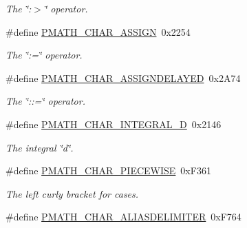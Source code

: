\begin{CompactItemize}
\begin{CompactList}\small\item\em The \char`\"{}:$>$\char`\"{} operator. \item\end{CompactList}\item 
\hypertarget{group__parser_gf80897e6fd9da9890087ad43967cf73b}{
\#define \hyperlink{group__parser_gf80897e6fd9da9890087ad43967cf73b}{PMATH\_\-CHAR\_\-ASSIGN}~0x2254}
\label{group__parser_gf80897e6fd9da9890087ad43967cf73b}

\begin{CompactList}\small\item\em The \char`\"{}:=\char`\"{} operator. \item\end{CompactList}\item 
\hypertarget{group__parser_g59eb4cde2e72bbfd90b6c2daf5521648}{
\#define \hyperlink{group__parser_g59eb4cde2e72bbfd90b6c2daf5521648}{PMATH\_\-CHAR\_\-ASSIGNDELAYED}~0x2A74}
\label{group__parser_g59eb4cde2e72bbfd90b6c2daf5521648}

\begin{CompactList}\small\item\em The \char`\"{}::=\char`\"{} operator. \item\end{CompactList}\item 
\hypertarget{group__parser_g819162acc8735cfe2a955796bb65583a}{
\#define \hyperlink{group__parser_g819162acc8735cfe2a955796bb65583a}{PMATH\_\-CHAR\_\-INTEGRAL\_\-D}~0x2146}
\label{group__parser_g819162acc8735cfe2a955796bb65583a}

\begin{CompactList}\small\item\em The integral \char`\"{}d\char`\"{}. \item\end{CompactList}\item 
\hypertarget{group__parser_g0bbf8248e09a8700eb27344d99e58a28}{
\#define \hyperlink{group__parser_g0bbf8248e09a8700eb27344d99e58a28}{PMATH\_\-CHAR\_\-PIECEWISE}~0xF361}
\label{group__parser_g0bbf8248e09a8700eb27344d99e58a28}

\begin{CompactList}\small\item\em The left curly bracket for cases. \item\end{CompactList}\item 
\hypertarget{group__parser_g320d88c3c66d3458f0d44e76f70e83aa}{
\#define \hyperlink{group__parser_g320d88c3c66d3458f0d44e76f70e83aa}{PMATH\_\-CHAR\_\-ALIASDELIMITER}~0xF764}
\label{group__parser_g320d88c3c66d3458f0d44e76f70e83aa}


\end{CompactItemize}
